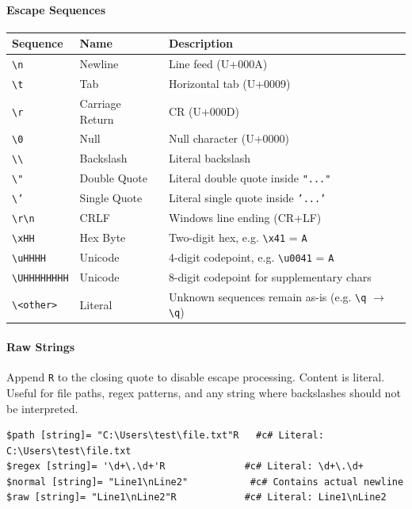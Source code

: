 \paragraph{Escape Sequences}
\begin{center}
\begin{tabular}{|l|l|l|}
\hline
\textbf{Sequence} & \textbf{Name} & \textbf{Description} \\
\hline
\texttt{\textbackslash n} & Newline & Line feed (U+000A) \\
\texttt{\textbackslash t} & Tab & Horizontal tab (U+0009) \\
\texttt{\textbackslash r} & Carriage Return & CR (U+000D) \\
\texttt{\textbackslash 0} & Null & Null character (U+0000) \\
\texttt{\textbackslash\textbackslash} & Backslash & Literal backslash \\
\texttt{\textbackslash"} & Double Quote & Literal double quote inside \texttt{"..."} \\
\texttt{\textbackslash'} & Single Quote & Literal single quote inside \texttt{'...'} \\
\texttt{\textbackslash r\textbackslash n} & CRLF & Windows line ending (CR+LF) \\
\texttt{\textbackslash xHH} & Hex Byte & Two-digit hex, e.g. \texttt{\textbackslash x41} = \texttt{A} \\
\texttt{\textbackslash uHHHH} & Unicode & 4-digit codepoint, e.g. \texttt{\textbackslash u0041} = \texttt{A} \\
\texttt{\textbackslash UHHHHHHHH} & Unicode & 8-digit codepoint for supplementary chars \\
\texttt{\textbackslash\textless{}other\textgreater{}} & Literal & Unknown sequences remain as-is (e.g. \texttt{\textbackslash q} $\rightarrow$ \texttt{\textbackslash q}) \\
\hline
\end{tabular}
\end{center}

\paragraph{Raw Strings}
Append \texttt{R} to the closing quote to disable escape processing. Content is literal. Useful for file paths, regex patterns, and any string where backslashes should not be interpreted.
\begin{verbatim}
$path [string]= "C:\Users\test\file.txt"R   #c# Literal: C:\Users\test\file.txt
$regex [string]= '\d+\.\d+'R              #c# Literal: \d+\.\d+
$normal [string]= "Line1\nLine2"           #c# Contains actual newline
$raw [string]= "Line1\nLine2"R            #c# Literal: Line1\nLine2
\end{verbatim}

